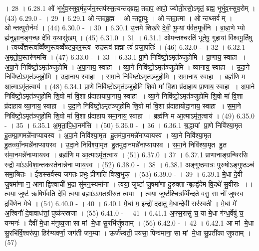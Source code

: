 । 28 ।
6.28.1
ओं भूर्भुव॒स्सुव॒र्मह॒र्जन॒स्तप॑स्स॒त्यन्तद्ब्रह्म॒ तदाप॒ आपो॒ ज्योती॒रसो॒ऽमृतं॒ ब्रह्म॒ भूर्भुव॒स्सुव॒रोम् । (43)
6.29.0
- । 29 ।
6.29.1
ओन्तद्ब्र॒ह्म । ओन्तद्वा॒युः । ओन्तदा॒त्मा । ओन्तथ्सर्वम् । ओन्तत्पुरो॒र्नमः॑ । (44)
6.30.0
- । 30 ।
6.30.1
उ॒त्तमे॑ शिख॑रे दे॒वी॒ भू॒म्यां प॑र्वत॒मूर्ध॑नि । ब्रा॒ह्म॒णेभ्यो ह्य॑नुज्ञा॒न॒ङ्ग॒च्छ दे॑वि य॒थासु॑खम् । (45)
6.31.0
। 31 ।
6.31.1
ओमन्तश्चरति॑ भूते॒षु॒ गुहायां वि॑श्वमू॒र्तिषु । त्वय्यँज्ञस्त्वव्विँष्णुस्त्वव्वँ॑षट्का॒र॒स्त्व रुद्रस्त्वं ब्रह्मा त्वं॑ प्रजा॒पतिः॑ । (46)
6.32.0
- । 32 ।
6.32.1
अ॒मृ॒तो॒प॒स्तर॑णमसि । (47)
6.33.0
- । 33 ।
6.33.1
प्रा॒णे निवि॑ष्टो॒ऽमृत॑ञ्जुहोमि । प्रा॒णाय॒ स्वाहा । अ॒पा॒ने निवि॑ष्टो॒ऽमृत॑ञ्जुहोमि । अ॒पा॒नाय॒ स्वाहा । व्या॒ने निवि॑ष्टो॒ऽमृत॑ञ्जुहोमि । व्यानाय॒ स्वाहा । उ॒दा॒ने निवि॑ष्टो॒ऽमृत॑ञ्जुहोमि । उ॒दा॒नाय॒ स्वाहा । स॒मा॒ने निवि॑ष्टो॒ऽमृत॑ञ्जुहोमि । स॒मा॒नाय॒ स्वाहा । ब्रह्म॑णि म आ॒त्माऽमृ॑त॒त्वाय॑ । (48)
6.34.1
प्रा॒णे निवि॑ष्टो॒ऽमृत॑ञ्जुहोमि शि॒वो मा॑ वि॒शा प्र॑दाहाय प्रा॒णाय॒ स्वाहा । अ॒पा॒ने निवि॑ष्टो॒ऽमृत॑ञ्जुहोमि शि॒वो मा॑ वि॒शा प्र॑दाहायापा॒नाय॒ स्वाहा । व्या॒ने निवि॑ष्टो॒ऽमृत॑ञ्जुहोमि शि॒वो मा॑ वि॒शा प्र॑दाहाय व्या॒नाय॒ स्वाहा । उ॒दा॒ने निवि॑ष्टो॒ऽमृत॑ञ्जुहोमि शि॒वो मा॑ वि॒शा प्र॑दाहायोदा॒नाय॒ स्वाहा । स॒मा॒ने निवि॑ष्टो॒ऽमृत॑ञ्जुहोमि शि॒वो मा॑ वि॒शा प्र॑दाहाय समा॒नाय॒ स्वाहा । ब्रह्म॑णि म आ॒त्माऽमृ॑त॒त्वाय॑ । (49)
6.35.0
- । 35 ।
6.35.1
अ॒मृ॒ता॒पि॒धा॒नम॑सि । (50)
6.36.0
- । 36 ।
6.36.1
श्र॒द्धायां प्रा॒णे निवि॑श्या॒मृत॑ हु॒तम्प्रा॒णमन्ने॑नाप्यायस्व । अ॒पा॒ने निवि॑श्या॒मृत॑ हु॒तम॑पा॒नमन्ने॑नाप्यायस्व । व्या॒ने निवि॑श्या॒मृत॑ हु॒तव्व्याँ॒नमन्ने॑नाप्यायस्व । उ॒दा॒ने निवि॑श्या॒मृत॑ हु॒तमु॑दा॒नमन्ने॑नाप्यायस्व । स॒मा॒ने निवि॑श्या॒मृत॑ हु॒त स॑मा॒नमन्ने॑नाप्यायस्व । ब्रह्म॑णि म आ॒त्माऽमृ॑त॒त्वाय॑ । (51)
6.37.0
। 37 ।
6.37.1
प्राणानाङ्ग्रन्थिरसि रुद्रो मा॑ऽऽविशा॒न्तकस्तेनान्नेनाप्याय॒स्व । (52)
6.38.0
- । 38 ।
6.38.1
अङ्गुष्ठमात्रः पुरुषोऽङ्गुष्ठञ्च॑ समा॒श्रितः । ईशस्सर्वस्य जगतः प्रभुः प्रीणाति॑ विश्व॒भुक् । (53)
6.39.0
- । 39 ।
6.39.1
मे॒धा दे॒वी जु॒षमा॑णा न॒ आगाद्वि॒श्वाची॑ भ॒द्रा सु॑मन॒स्यमा॑ना । त्वया॒ जुष्टा॑ जु॒षमा॑णा दु॒रुक्तान्बृ॒हद्व॑देम वि॒दथे॑ सु॒वीराः ।। त्वया॒ जुष्ट॑ ऋ॒षिर्भ॑वति देवि॒ त्वया॒ ब्रह्मा॑ऽऽग॒तश्री॑रु॒त त्वया । त्वया॒ जुष्ट॑श्चि॒त्रव्विँ॑न्दते वसु॒ सा नो॑ जुषस्व॒ द्रवि॑णेन मेधे । (54)
6.40.0
- । 40 ।
6.40.1
मे॒धां म॒ इन्द्रो॑ ददातु मे॒धान्दे॒वी सर॑स्वती । मे॒धां मे॑ अ॒श्विनौ॑ दे॒वावाध॑त्तां॒ पुष्क॑रस्रजा । (55)
6.41.0
- । 41 ।
6.41.1
अ॒फ्स॒रासु॑ च॒ या मे॒धा ग॑न्ध॒र्वेषु॑ च॒ यन्मनः॑ । दैवी॑ मे॒धा म॑नुष्य॒जा सा मां मे॒धा सु॒रभि॑र्जुषताम् । (56)
6.42.0
- । 42 ।
6.42.1
आ मां मे॒धा सु॒रभि॑र्वि॒श्वरू॑पा॒ हिर॑ण्यवर्णा॒ जग॑ती जग॒म्या । ऊर्ज॑स्वती॒ पय॑सा॒ पिन्व॑माना॒ सा मां मे॒धा सु॒प्रती॑का जुषताम् । (57)
